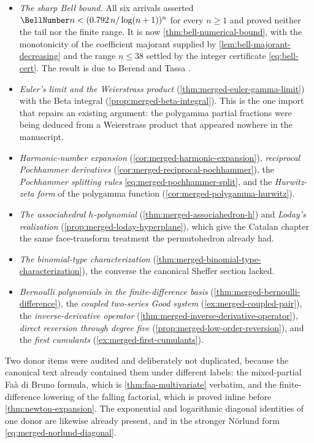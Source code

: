 \documentclass[11pt,a4paper,oneside,openany]{book}
\theoremstyle{definition}
\theoremstyle{remark}
\begin{document}
\begin{itemize}\setlength{\itemsep}{2pt}
\item \emph{The sharp Bell bound.}  All six arrivals asserted
      $\BellNumber n<(0.792\,n/\log(n+1))^n$ for every $n\ge1$ and proved
      neither the tail nor the finite range.  It is now
      \cref{thm:bell-numerical-bound}, with the monotonicity of the coefficient
      majorant supplied by \cref{lem:bell-majorant-decreasing} and the range
      $n\le38$ settled by the integer certificate \eqref{eq:bell-cert}.  The
      result is due to Berend and Tassa \cite{BerendTassa2010}.
\item \emph{Euler's limit and the Weierstrass product}
      (\cref{thm:merged-euler-gamma-limit}) with the Beta integral
      (\cref{prop:merged-beta-integral}).  This is the one import that repairs
      an existing argument: the polygamma partial fractions were being deduced
      from a Weierstrass product that appeared nowhere in the manuscript.
\item \emph{Harmonic-number expansion} (\cref{cor:merged-harmonic-expansion}),
      \emph{reciprocal Pochhammer derivatives}
      (\cref{cor:merged-reciprocal-pochhammer}), the \emph{Pochhammer splitting
      rules} \eqref{eq:merged-pochhammer-split}, and the \emph{Hurwitz-zeta
      form} of the polygamma function (\cref{cor:merged-polygamma-hurwitz}).
\item \emph{The associahedral $h$-polynomial}
      (\cref{thm:merged-associahedron-h}) and \emph{Loday's realization}
      (\cref{prop:merged-loday-hyperplane}), which give the Catalan chapter the
      same face-transform treatment the permutohedron already had.
\item \emph{The binomial-type characterization}
      (\cref{thm:merged-binomial-type-characterization}), the converse the
      canonical Sheffer section lacked.
\item \emph{Bernoulli polynomials in the finite-difference basis}
      (\cref{thm:merged-bernoulli-difference}), the \emph{coupled two-series
      Good system} (\cref{ex:merged-coupled-pair}), the
      \emph{inverse-derivative operator}
      (\cref{thm:merged-inverse-derivative-operator}), \emph{direct reversion
      through degree five} (\cref{prop:merged-low-order-reversion}), and the
      \emph{first cumulants} (\cref{ex:merged-first-cumulants}).
\end{itemize}

Two donor items were audited and deliberately not duplicated, because the
canonical text already contained them under different labels: the mixed-partial
Faà di Bruno formula, which is \cref{thm:faa-multivariate} verbatim, and the
finite-difference lowering of the falling factorial, which is proved inline
before \cref{thm:newton-expansion}.  The exponential and logarithmic diagonal
identities of one donor are likewise already present, and in the stronger
Nörlund form \eqref{eq:merged-norlund-diagonal}.
\end{document}
